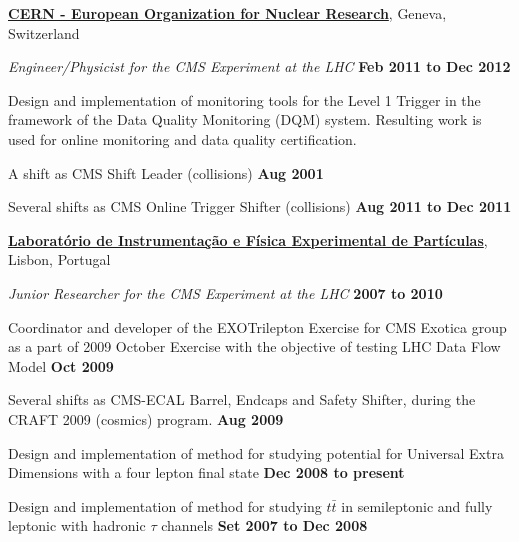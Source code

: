 \documentclass[10pt]{article}
\newenvironment{outerlist}[1][\enskip\textbullet]%
        {\begin{itemize}[#1]}{\end{itemize}%
         \vspace{-.6\baselineskip}}
\newenvironment{innerlist}[1][\enskip\textbullet]%
        {\begin{compactitem}[#1]}{\end{compactitem}}
\newcommand{\blankline}{\quad\pagebreak[2]}
\begin{document}
%
\href{http://www.cern.ch/}{\textbf{CERN - European Organization for Nuclear Research}},
Geneva, Switzerland
\begin{outerlist}

\item[] \textit{Engineer/Physicist for the CMS Experiment at the LHC}%
        \hfill \textbf{Feb 2011 to Dec 2012}
\begin{innerlist}
\item Design and implementation of monitoring tools for the Level 1 Trigger in the framework of
      the Data Quality Monitoring (DQM) system. Resulting work is used for online monitoring and
      data quality certification. 
\item A shift as CMS Shift Leader (collisions) \hfill \textbf{Aug 2001}
\item Several shifts as CMS Online Trigger Shifter (collisions) \hfill \textbf{Aug 2011 to Dec 2011}
\end{innerlist}

\end{outerlist}
\blankline

%
\href{http://www.lip.pt/}{\textbf{Laboratório de Instrumentação e Física Experimental de Partículas}},
Lisbon, Portugal
\begin{outerlist}

\item[] \textit{Junior Researcher for the CMS Experiment at the LHC}%
        \hfill \textbf{2007 to 2010}
\begin{innerlist}
\item Coordinator and developer of the EXOTrilepton Exercise for CMS Exotica group as a part of 2009 October Exercise with the objective of testing LHC Data Flow Model
\hfill \textbf{Oct 2009}
\item Several shifts as CMS-ECAL Barrel, Endcaps and Safety Shifter, during the CRAFT 2009 (cosmics) program. 
\hfill \textbf{Aug 2009}
\item Design and implementation of method for studying potential for Universal Extra Dimensions with a four lepton final state
\hfill \textbf{Dec 2008 to present}
\item Design and implementation of method for studying $t\bar{t}$ in semileptonic and fully leptonic with hadronic $\tau$ channels
\hfill \textbf{Set 2007 to Dec 2008}
\end{innerlist}

\end{outerlist}

\blankline
\end{document}
